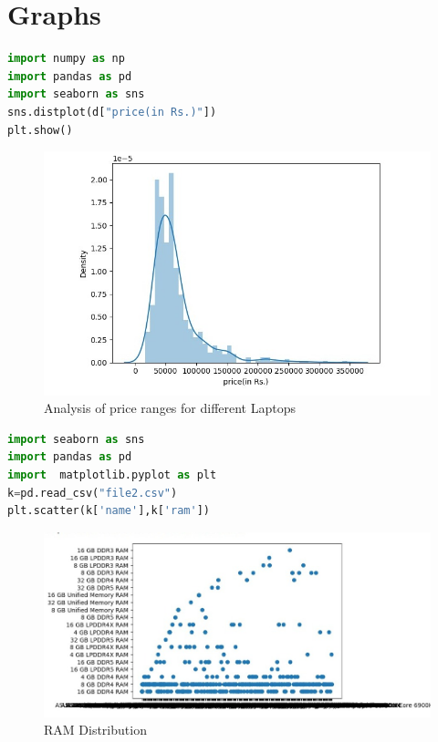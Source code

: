 \section{Graphs}
\begin{lstlisting}[language=Python]
import numpy as np 
import pandas as pd 
import seaborn as sns 
sns.distplot(d["price(in Rs.)"])
plt.show()
\end{lstlisting}
 \begin{figure}[h]
\centering
 \footnotesize
 \includegraphics[width=6in]{1.png}
\caption{Analysis of price ranges for different Laptops}
\label{fig:dunnhalftone}
\end{figure} 
\begin{lstlisting}[language=Python]
import seaborn as sns
import pandas as pd
import  matplotlib.pyplot as plt
k=pd.read_csv("file2.csv")
plt.scatter(k['name'],k['ram'])
\end{lstlisting}
\vspace{5\baselineskip}
\begin{figure}[h]
\centering
 \footnotesize
 \includegraphics[width=6in]{2.png}
\caption{RAM Distribution}
\label{fig:dunnhalftone}
\end{figure} 
